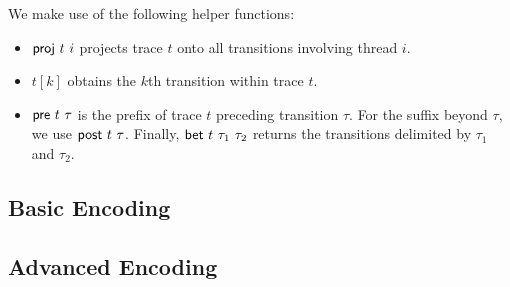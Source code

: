 We make use of the following helper functions:
\begin{itemize}
	\item ${\sf proj}\ t\ i$ projects trace $t$ onto all transitions involving thread $i$.
	\item $t[k]$ obtains the $k$th transition within trace $t$.
	\item ${\sf pre}\ t\ \tau$ is the prefix of trace $t$ preceding transition $\tau$. For the suffix beyond $\tau$, we 
	use ${\sf post}\ t\ \tau$. Finally, ${\sf bet}\ t\ \tau_1\ \tau_2$ returns the transitions delimited by $\tau_1$ and $\tau_2$.
\end{itemize}

\subsection{Basic Encoding}

\subsection{Advanced Encoding}